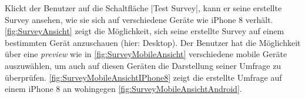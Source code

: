 Klickt der Benutzer auf die Schaltfläche \jinline|Test Survey|, kann er seine erstellte Survey ansehen, wie sie sich auf verschiedene Geräte wie \zb iPhone 8 verhält.
\abb \vref{fig:SurveyAnsicht} zeigt die Möglichkeit, sich seine erstellte Survey auf einem bestimmten Gerät  anzuschauen (hier: Desktop).  
Der Benutzer hat die Möglichkeit über eine \emph{preview} wie in \abb \vref{fig:SurveyMobileAnsicht} verschiedene mobile Geräte auszuwählen, um auch auf diesen Geräten die Darstellung seiner Umfrage zu überprüfen. 
\abb \vref{fig:SurveyMobileAnsichtIPhone8} zeigt die erstellte Umfrage auf einem iPhone 8 an wohingegen \abb \vref{fig:SurveyMobileAnsichtAndroid}. 


\begin{figure}[!htb]
	\centering
	\captionsetup{justification=centering, format=plain}
	\hfill
	\hfill
	\hfill

\end{figure}
